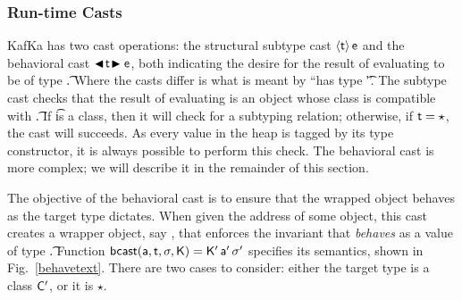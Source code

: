 \documentclass[a4paper,USenglish]{lipics-v2018}
\newcommand{\EM}[1]{\ensuremath{#1}\xspace}
\newcommand{\xt}[1]{{\sf{#1}}}
\newcommand{\EMxt}[1]{\EM{\xt{#1}}}
\newcommand{\s}{\EM{\sigma}}
\newcommand{\K}{\EMxt K}
\newcommand{\Kp}{{\EMxt{K'}}}
\renewcommand{\sp}{{{\EM{\s'}}}}
\newcommand{\Cp}{\EMxt{C'}}
\newcommand{\any}{\EM{\star}}
\newcommand{\SubCast}[2]{\EM{\langle{#1}\rangle\,{#2}}}
\newcommand{\BehStart}{\EM{\blacktriangleleft}}
\newcommand{\BehEnd}{\EM{\blacktriangleright}}
\newcommand{\BehCast}[2]{\EM{\BehStart\! #1\! \BehEnd #2}}
\newcommand{\behcastE}[7]{\EM{\xt{bcast}(#1, #2, #3, #4) = #5\,#6\,#7}}
\newcommand{\figref}[1]{Fig.~\ref{#1}\xspace}
\newcommand{\kafka}{{\sf KafKa}\xspace}
\begin{document}
\subsubsection{Run-time Casts}

\kafka has two cast operations: the structural subtype cast $\SubCast\t\e$ and the
behavioral cast $\BehCast\t\e$, both indicating the desire for the result
of evaluating \e to be of type \t. Where the casts differ is what is meant by
``has type \t''. The subtype cast checks that the result of evaluating \e
is an object whose class is compatible with \t. If \t is a class, then it
will check for a subtyping relation; otherwise, if \EM{\t=\any}, the cast 
will succeeds. As every value in the heap is
tagged by its type constructor, it is always possible to perform this check. 
The behavioral cast is more complex; we will
describe it in the remainder of this section.

The objective of the behavioral cast is to ensure that the wrapped object
behaves as the target type dictates. When given the address \a of some
object, this cast creates a wrapper object, say \ap, that enforces the 
invariant that \a \emph{behaves} as a
value of type \t. Function \behcastE\a\t\s\K \Kp\ap\sp specifies its
semantics, shown in \figref{behavetext}. There are two cases to consider:
either the target type is a class \Cp, or it is \any.
\end{document}

